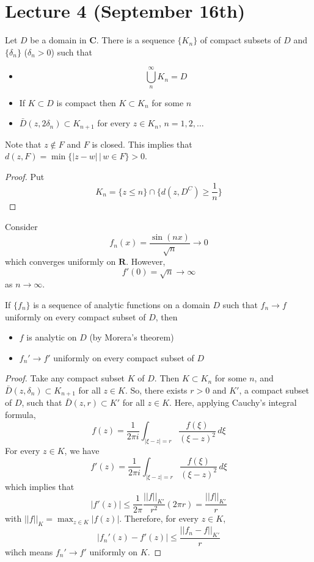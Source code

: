 \section{Lecture 4 (September 16th)}
\begin{thm}
Let $D$ be a domain in ${\bm C}$. There is a sequence $\{K_{n}\}$ of compact subsets of $D$ and $\{\delta _{n}\}$ ($\delta _{n}>0$) such that
\begin{itemize}
\item[(i)] \[\bigcup ^{\infty }_{n}K_{n}=D\]
\item[(ii)] If $K\subset D$ is compact then $K\subset K_{n}$ for some $n$
\item[(iii)] $\bar{D}(z,2\delta _{n})\subset K_{n+1}$ for every $z\in K_{n}$, $n=1,2,\ldots $
\end{itemize}
Note that $z\notin F$ and $F$ is closed. This implies that $d(z,F)=\min\{|z-w| \,|\, w\in F\}>0$.
\end{thm}
\vspace{2ex}
\begin{proof}
Put
\[K_{n}=\Big\{z\leq n\Big\}\cap \Big\{d(z,D^{C})\geq \dfrac{1}{n}\Big\}\]
\end{proof}
\vspace{2ex}
\begin{ex}
Consider 
\[f_{n}(x)=\dfrac{\sin (nx)}{\sqrt{n}}\rightarrow 0\]
which converges uniformly on ${\bm R}$. However,
\[f'(0)=\sqrt{n}\rightarrow \infty \]
as $n\rightarrow \infty $.
\end{ex}
\vspace{2ex}
\begin{thm}
If $\{f_{n}\}$ is a sequence of analytic functions on a domain $D$ such that $f_{n}\rightarrow f$ uniformly on every compact subset of $D$, then 
\begin{itemize}
\item[(i)] $f$ is analytic on $D$ (by Morera's theorem)
\item[(ii)] $f_{n}'\rightarrow f'$ uniformly on every compact subset of $D$
\end{itemize}
\end{thm}
\vspace{2ex}
\begin{proof}
Take any compact subset $K$ of $D$. Then $K\subset K_{n}$ for some $n$, and $\bar{D}(z,\delta _{n})\subset K_{n+1}$ for all $z\in K$. So, there exists $r>0$ and $K'$, a compact subset of $D$, such that $\bar{D}(z,r)\subset K'$ for all $z\in K$. Here, applying Cauchy's integral formula,
\[f(z)=\dfrac{1}{2\pi i}\int _{|\xi -z|=r}\dfrac{f(\xi )}{(\xi -z)^2}\,d\xi \]
For every $z\in K$, we have
\[f'(z)=\dfrac{1}{2\pi i}\int _{|\xi -z|=r}\dfrac{f(\xi )}{(\xi -z)^2}\,d\xi \]
which implies that
\[|f'(z)|\leq \dfrac{1}{2\pi }\dfrac{||f||_{K'}}{r^2}(2\pi r)=\dfrac{||f||_{K'}}{r}\]
with $||f||_{K}=\max_{z\in K}|f(z)|$. Therefore, for every $z\in K$,
\[|f_{n}'(z)-f'(z)|\leq \dfrac{||f_{n}-f||_{K'}}{r}\]
wihch means $f_{n}'\rightarrow f'$ uniformly on $K$. 
\end{proof}
